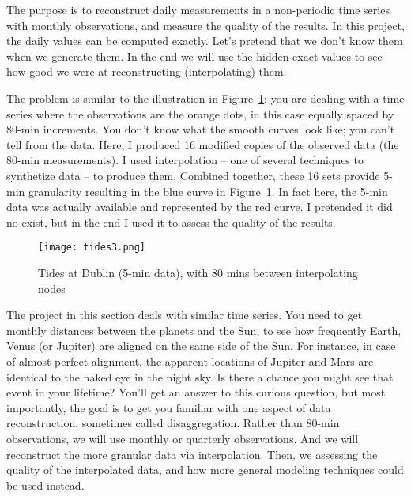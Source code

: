 \documentclass[oneside,10pt]{book}
\begin{document}
The purpose is to reconstruct  daily measurements in a non-periodic time series with monthly observations, and measure the quality of the
results. 
In this project, the daily values can be computed exactly. Let's pretend that we don't know them when we generate them.  In the end we will use the hidden exact values to see how good we were at reconstructing (interpolating) them.  

The problem is similar to the illustration
 in Figure~\ref{fig:tides}: you are dealing with a time series where the observations are the orange dots, in this case equally spaced by 80-min increments. You don't know what the smooth curves look like; you can't tell from the data. Here, I produced 16 modified copies of the observed data (the 80-min measurements). I used \textcolor{index}{interpolation} -- one of several techniques to synthetize data -- to produce them. Combined together, these 16 sets provide 5-min granularity resulting in the blue curve in Figure~\ref{fig:tides}. In fact here, the 5-min data was actually available and represented by the red curve. I pretended it did no exist, but in the end I used it to assess the quality of the results.

\begin{figure}[H]
\centering
\texttt{[image: tides3.png]} %
\caption{Tides at Dublin (5-min data), with 80 mins between interpolating nodes}
\label{fig:tides}
\end{figure}

The project in this section deals with similar time series. You need to get monthly distances between the planets and the Sun, to see how frequently Earth, Venus (or Jupiter) are aligned on the same side of the Sun. For instance, in case of almost perfect alignment, the apparent locations of Jupiter and Mars are identical to the naked eye in the night sky. Is there a chance you might see that event in your lifetime? You'll get an answer to this curious question, but most importantly, the goal is to get you familiar with one aspect of data reconstruction, sometimes
 called \textcolor{index}{disaggregation}. Rather than 80-min observations, we will use monthly or quarterly observations. And we will reconstruct the more granular data via interpolation. Then, we assessing the quality of the interpolated data, and how more general modeling techniques could be used instead.
\end{document}
